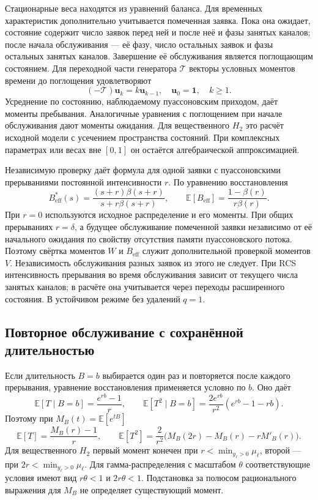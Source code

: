 \documentclass[a4paper,12pt]{article}
\begin{document}
Стационарные веса находятся из уравнений баланса. Для временных характеристик дополнительно учитывается помеченная заявка. Пока она ожидает, состояние содержит число заявок перед ней и после неё и фазы занятых каналов; после начала обслуживания --- её фазу, число остальных заявок и фазы остальных занятых каналов. Завершение её обслуживания является поглощающим состоянием. Для переходной части генератора \(\mathcal T\) векторы условных моментов времени до поглощения удовлетворяют
\[
(-\mathcal T)\boldsymbol u_k=k\boldsymbol u_{k-1},\quad
\boldsymbol u_0=\mathbf1,\quad k\ge1.
\]
Усреднение по состоянию, наблюдаемому пуассоновским приходом, даёт моменты пребывания. Аналогичные уравнения с поглощением при начале обслуживания дают моменты ожидания. Для вещественного \(H_2\) это расчёт исходной модели с усечением пространства состояний. При комплексных параметрах или весах вне \([0,1]\) он остаётся алгебраической аппроксимацией.

Независимую проверку даёт формула для одной заявки с пуассоновскими прерываниями постоянной интенсивности \(r.\) По уравнению восстановления \cite{pal2017}
\[
B_{\mathrm{eff}}^*(s)=\frac{(s+r)\beta(s+r)}{s+r\beta(s+r)},\qquad
\mathbb E[B_{\mathrm{eff}}]=\frac{1-\beta(r)}{r\beta(r)}.
\]
При \(r=0\) используются исходное распределение и его моменты. При общих прерываниях \(r=\delta\), а будущее обслуживание помеченной заявки независимо от её начального ожидания по свойству отсутствия памяти пуассоновского потока. Поэтому свёртка моментов \(W\) и \(B_{\mathrm{eff}}\) служит дополнительной проверкой моментов \(V.\) Независимость обслуживания разных заявок из этого не следует. При RCS интенсивность прерывания во время обслуживания зависит от текущего числа занятых каналов; в расчёте она учитывается через переходы расширенного состояния. В устойчивом режиме без удалений \(q=1.\)

\subsection{Повторное обслуживание с сохранённой длительностью}
Если длительность \(B=b\) выбирается один раз и повторяется после каждого прерывания, уравнение восстановления применяется условно по \(b.\) Оно даёт
\[
\mathbb E[T\mid B=b]=\frac{e^{rb}-1}{r},\qquad
\mathbb E[T^2\mid B=b]=\frac{2e^{rb}}{r^2}(e^{rb}-1-rb).
\]
Поэтому при \(M_B(t)=\mathbb E[e^{tB}]\)
\[
\mathbb E[T]=\frac{M_B(r)-1}{r},\qquad
\mathbb E[T^2]=\frac{2}{r^2}\bigl(M_B(2r)-M_B(r)-rM'_B(r)\bigr).
\]
Для вещественного \(H_2\) первый момент конечен при \(r<\min_{y_\ell>0}\mu_\ell\), второй --- при \(2r<\min_{y_\ell>0}\mu_\ell.\) Для гамма-распределения с масштабом \(\theta\) соответствующие условия имеют вид \(r\theta<1\) и \(2r\theta<1.\) Подстановка за полюсом рационального выражения для \(M_B\) не определяет существующий момент.
\end{document}
